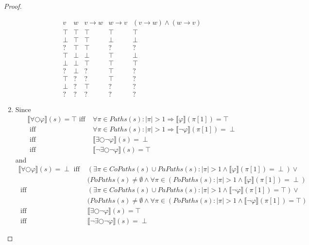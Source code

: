 \documentclass[12pt]{article}
\newcommand{\nxt}{\bigcirc}
\theoremstyle{definition}
\newcommand{\satisfaction}[1]{\llbracket #1 \rrbracket}
\newenvironment{franck}{\color{red}}{\color{black}}
\begin{document}
\begin{franck}
\begin{proof}
\begin{enumerate}
\[
\begin{array}{ll|ll|l}
v     & w     & v \rightarrow w & w \rightarrow v & (v \rightarrow w) \wedge (w \rightarrow v)\\\hline
\top  & \top  & \top  & \top  & \top\\
\perp & \top  & \top  & \perp & \perp\\
?     & \top  & \top  & ?     & ?\\
\top  & \perp & \perp & \top  & \perp\\
\perp & \perp & \top  & \top  & \top\\
?     & \perp & ?     & \top  & ?\\
\top  & ?     & ?     & \top  & ?\\
\perp & ?     & \top  & ?     & ?\\
?     & ?     & ?     & ?     & ?
\end{array}
\]
\item
Since
\begin{align*}
\satisfaction{\forall \nxt \varphi}(s) = \top
\mbox{ iff } & \forall \pi \in \mathit{Paths}(s) : |\pi| > 1 \Rightarrow \satisfaction{\varphi}(\pi[1]) = \top\\
\mbox{ iff } & \forall \pi \in \mathit{Paths}(s) : |\pi| > 1 \Rightarrow \satisfaction{\neg \varphi}(\pi[1]) = \perp\\
\mbox{ iff } & \satisfaction{\exists \nxt \neg \varphi}(s) = \perp\\
\mbox{ iff } & \satisfaction{\neg \exists \nxt \neg \varphi}(s) = \top
\end{align*}
and
\begin{align*}
\satisfaction{\forall \nxt \varphi}(s) = \perp
\mbox{ iff } & (\exists \pi \in \mathit{CoPaths}(s) \cup \mathit{PaPaths}(s) : |\pi| > 1 \wedge \satisfaction{\varphi}(\pi[1]) = \perp) \vee\\
& (\mathit{PoPaths}(s) \not= \emptyset \wedge \forall \pi \in (\mathit{PoPaths}(s) : |\pi| > 1 \wedge \satisfaction{\varphi}(\pi[1]) = \perp)\\
\mbox{ iff } & (\exists \pi \in \mathit{CoPaths}(s) \cup \mathit{PaPaths}(s) : |\pi| > 1 \wedge \satisfaction{\neg \varphi}(\pi[1]) = \top) \vee\\
& (\mathit{PoPaths}(s) \not= \emptyset \wedge \forall \pi \in (\mathit{PoPaths}(s) : |\pi| > 1 \wedge \satisfaction{\neg \varphi}(\pi[1]) = \top)\\
\mbox{ iff } & \satisfaction{\exists \nxt \neg \varphi}(s) = \top\\
\mbox{ iff } & \satisfaction{\neg \exists \nxt \neg \varphi}(s) = \perp

\end{align*}
\end{enumerate}
\end{proof}
\end{franck}
\end{document}

